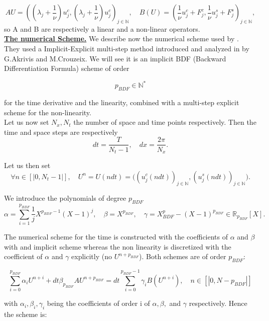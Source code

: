 \documentclass[12pt]{article}
\begin{document}
$$AU = \left((\lambda_j + \frac{1}{\nu})u^c_j, (\lambda_j + \frac{1}{\nu})u^c_j\right)_{j \in \mathbb{N}}, \quad B(U) = 
\left(\frac{1}{\nu}u_j^c + F_j^c, \frac{1}{\nu}u_j^s + F_j^s\right)_{j\in \mathbb{N}},$$
so A and B are respectively a linear and a non-linear operators.
\\

\underline{\textbf{The numerical Scheme.}} We describe now the numerical scheme used by \cite{Scheme_for_KS}. They used a Implicit-Explicit
 multi-step method introduced and analyzed in \cite{KS_scheme_C_A} by G.Akrivis and M.Crouzeix. We will see it is an implicit BDF (Backward 
 Differentiation Formula) scheme of order 

\begin{equation}
    p_{BDF} \in \mathbb{N}^*
\end{equation} 

for the time derivative and the linearity, combined with a multi-step explicit scheme for the non-linearity. 
\\

Let us now set $N_x, N_t$ the number of space and time points respectively. Then the time and space steps are respectively 
$$dt = \frac{T}{N_t-1},\quad dx = \frac{2\pi}{N_x}.$$ 

Let us then set $$\forall n\in [|0, N_t-1|], \quad U^n = U(ndt) = \Big( (u_j^c(ndt))_{j\in \mathbb{N}}, (u_j^s(ndt))_{j\in \mathbb{N}}\Big).$$

We introduce the polynomials of degree $p_{BDF}$
 \begin{equation}
     \alpha = \sum_{i=1}^{p_{BDF}} \frac{1}{j}X^{p_{BDF}-1}(X-1)^j, \quad  \beta = X^{p_{BDF}}, \quad \gamma = X^p_{BDF} - (X-1)^{p_{BDF}} \in \mathbb{R}_{p_{BDF}}[X].
 \end{equation}

The numerical scheme for the time is constructed with the coefficients of $\alpha$ and $\beta$ with and implicit scheme whereas the non
 linearity is discretized with the coefficient of $\alpha$ and $\gamma$ explicitly (no $U^{n+p_{BDF}}$). Both schemes are of order $p_{BDF}$:

\begin{equation}
    \sum_{i=0}^{p_{BDF}} \alpha_i U^{n+i} + dt\beta_{p_{BDF}}AU^{n+p_{BDF}} = dt\sum_{i=0}^{p_{BDF}-1} \gamma_iB(U^{n+i}), \quad n\in [|0, N-p_{BDF}|]
\end{equation}

with $\alpha_i, \beta_i, \gamma_i$ being the coefficients of order i of $\alpha, \beta,$ and $\gamma$ respectively. Hence the scheme is: 
\\
\end{document}
